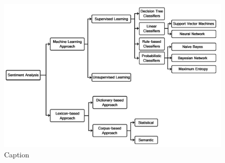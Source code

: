 \begin{figure}
    \centering
    \includegraphics[scale=0.3]{Images/classification_techniques.png}
    \caption{Caption}
    \label{fig:classifiers}
\end{figure}
